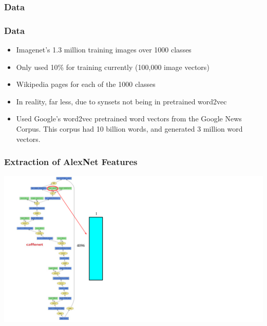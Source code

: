 \documentclass{beamer}
\begin{document}
\begin{frame}
  \frametitle{Data}
\end{frame}

\begin{frame}
  \frametitle{Data}
  \begin{itemize}
  \item Imagenet's 1.3 million training images over 1000 classes
  \item Only used 10\% for training currently (100,000 image vectors)
  \item Wikipedia pages for each of the 1000 classes
  \item In reality, far less, due to synsets not being in pretrained word2vec
  \item Used Google's word2vec pretrained word vectors from the Google News Corpus.
	This corpus had 10 billion words, and generated 3 million word vectors.
  \end{itemize}
\end{frame}

\begin{frame}
  \frametitle{Extraction of AlexNet Features}
  \begin{center}
    \includegraphics[height=0.9\textheight]{assets/CaffeNetFeatures.pdf}
  \end{center}
\end{frame}
\end{document}
